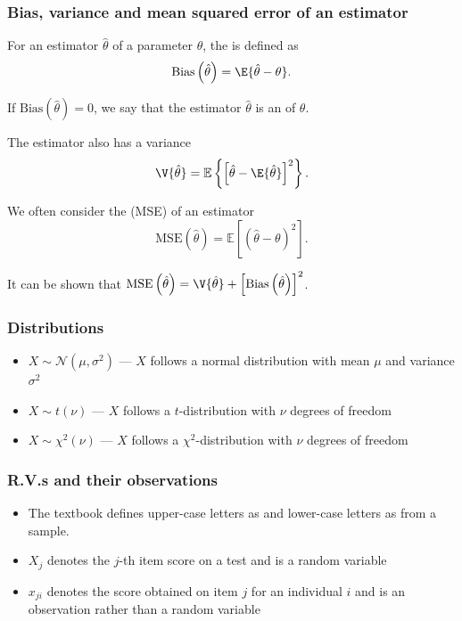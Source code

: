 \documentclass[compress]{beamer}\usepackage[]{graphicx}\usepackage[]{xcolor}
\begin{document}
\begin{frame}[fragile]
  \frametitle{Bias, variance and mean squared error of an estimator}
    For an estimator $\hat{\theta}$ of a parameter $\theta$, the  is defined as
      \[ \text{Bias} \left( \hat{\theta} \right) = \E{\hat{\theta} - \theta}. \]

    If $\text{Bias} \left( \hat{\theta} \right) = 0$, we say that the estimator $\hat{\theta}$ is an  of $\theta$.

    The estimator also has a variance
      \[ \V{\hat{\theta}} = \mathbb{E} \left\{ \left[ \hat{\theta} - \E{\hat{\theta}} \right]^2 \right\}. \]

    We often consider the  (MSE) of an estimator
      \[ \text{MSE} \left( \hat{\theta} \right) = \mathbb{E} \left[ \left( \hat{\theta} - \theta \right)^2 \right]. \]

    It can be shown that $\text{MSE} \left( \hat{\theta} \right) = \V{\hat{\theta}} + \left[ \text{Bias} \left( \hat{\theta} \right) \right]^2$.
\end{frame}


\begin{frame}[fragile]
  \frametitle{Distributions}
    \begin{itemize}
      \item $X \sim \mathcal{N}(\mu, \sigma^2)$ --- $X$ follows a normal distribution with mean $\mu$ and variance $\sigma^2$
      \item $X \sim t(\nu)$ --- $X$ follows a $t$-distribution with $\nu$ degrees of freedom
      \item $X \sim \chi^2(\nu)$ --- $X$ follows a $\chi^2$-distribution with $\nu$ degrees of freedom
    \end{itemize}
\end{frame}

\begin{frame}[fragile]
  \frametitle{R.V.s and their observations}
    \begin{itemize}
    \item The textbook defines upper-case letters as  and lower-case letters as  from a sample.
    \item $X_j$ denotes the $j$-th item score on a test and is a random variable
    \item $x_{ji}$ denotes the score obtained on item $j$ for an individual $i$ and is an observation rather than a random variable
    \end{itemize}
\end{frame}
\end{document}
